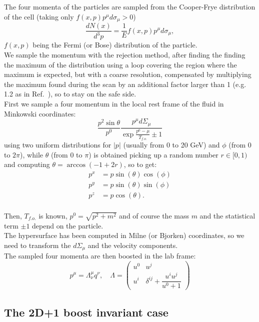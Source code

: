 \documentclass[12pt, a4paper]{report}
\begin{document}
	The four momenta of the particles are sampled from the 
	Cooper-Frye distribution of the cell (taking only  
	$f(x,p) p^\mu d\sigma_{\mu} >0$)
	\begin{equation}
	\frac{d N(x)}{d^3p} = \frac{1}{E} f(x,p) p^\mu d\sigma_{\mu},
	\end{equation}
	$f(x,p)$ being the Fermi (or Bose) distribution of the particle.\\
	We sample the momentum with the rejection method, after finding the finding the maximum of
	the distribution using a loop covering the region where the maximum is expected, but with a coarse resolution, compensated by multiplying the maximum found during the scan by an additional factor larger than 1 (e.g.  1.2 as in Ref.~\cite{Huovinen:2012is}), so to stay on the safe side.\\
    First we sample a four momentum in the local rest frame of the fluid in Minkowski coordinates:
	\begin{equation}
	\dfrac{p^2 \sin{\theta}}{p^0}\dfrac{p^{\mu}d\Sigma_{\mu}}{\exp{\frac{p^0-\mu}{T_{f.o.}}}\pm 1}
	\label{mycf}
	\end{equation}
	using two uniform distributions for $|p|$ (usually from 0 to 20 GeV) and $\phi$ (from 0 to $2\pi$), while $\theta$ (from 0 to $\pi$) is obtained picking up a random number $r\in [0,1)$ and computing $\theta=\arccos(-1+2r)$, so to get:
	\begin{align}
	p^x&=p\sin(\theta)\cos(\phi)\\
	p^y&=p\sin(\theta)\sin(\phi)\\
	p^z&=p\cos(\theta).\\
	\end{align}
	
	Then, $T_{f.o.}$ is known, $p^0=\sqrt{p^2+m^2}$ and of course the mass $m$ and the statistical term $\pm 1$ depend on the particle.\\
	The hypersurface has been computed in Milne (or Bjorken) coordinates, so we need to transform the $d\Sigma_{\mu}$ and the velocity components.\\	
	The sampled four momenta are then boosted in the lab frame:
	\begin{equation}
	p^{\mu}=\Lambda^{\mu}_{\nu}q^{\nu}, \quad \Lambda=
	\begin{pmatrix} u^0 & u^j\\ u^i & \delta^{ij}+\dfrac{u^i u^j}{u^0+1}\end{pmatrix}
	\end{equation}
	\subsection{The 2D+1 boost invariant case}
\end{document}
